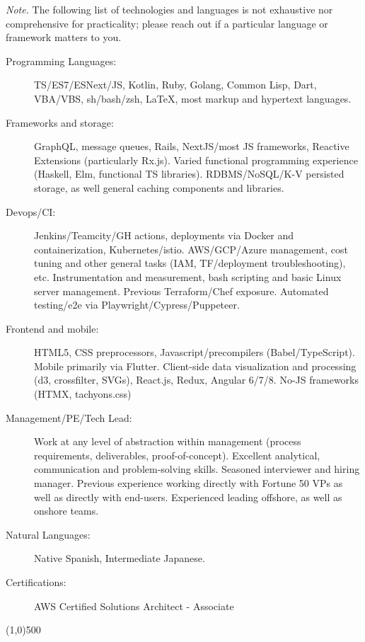 \documentclass[letterpaper,11pt]{article}
\newcommand{\addline}{\line(1,0){500}}
\begin{document}
\vspace{2pt}
\textit{Note.} The following list of technologies and languages is not exhaustive nor comprehensive for practicality; please reach out if a particular language or framework matters to you.
\begin{description}
	\item[Programming Languages:]
    TS/ES7/ESNext/JS, Kotlin, Ruby, Golang, Common Lisp, Dart, VBA/VBS, sh/bash/zsh, \LaTeX, most markup and hypertext languages. 

	\item[Frameworks and storage:]
    GraphQL, message queues, Rails, NextJS/most JS frameworks, Reactive Extensions (particularly Rx.js). Varied functional programming experience (Haskell, Elm, functional TS libraries). RDBMS/NoSQL/K-V persisted storage, as well general caching components and libraries.

	\item [Devops/CI:]
    Jenkins/Teamcity/GH actions, deployments via Docker and containerization, Kubernetes/istio. AWS/GCP/Azure management, cost tuning and other general tasks (IAM, TF/deployment troubleshooting), etc. Instrumentation and measurement, bash scripting and basic Linux server management. Previous Terraform/Chef exposure. Automated testing/e2e via Playwright/Cypress/Puppeteer.

  \item [Frontend and mobile:]
    HTML5, CSS preprocessors, Javascript/precompilers (Babel/TypeScript). Mobile primarily via Flutter. Client-side data visualization and processing (d3, crossfilter, SVGs), React.js, Redux, Angular 6/7/8. No-JS frameworks (HTMX, tachyons.css)

	\item[Management/PE/Tech Lead:]
    Work at any level of abstraction within management (process requirements, deliverables, proof-of-concept). Excellent analytical, communication and problem-solving skills. Seasoned interviewer and hiring manager. Previous experience working directly with Fortune 50 VPs as well as directly with end-users. Experienced leading offshore, as well as onshore teams.

	\item[Natural Languages:]
		Native Spanish, Intermediate Japanese.

	\item[Certifications:]
		AWS Certified Solutions Architect - Associate

\end{description}
\addline
\end{document}
